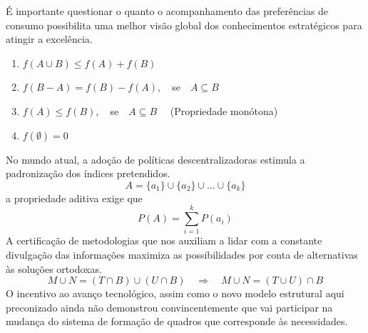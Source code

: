 \documentclass[fleqn]{profmat-cefet}
\begin{document}
É importante questionar o quanto o
acompanhamento das preferências de consumo possibilita uma melhor visão global
dos conhecimentos estratégicos para atingir a excelência. 
\begin{enumerate}[label=\alph*)]
    \item $f(A\cup B)\leq f(A)+f(B)$
    \item $f(B-A)=f(B)-f(A), \quad $se$\quad A\subseteq B$
    \item $f(A)\leq f(B), \quad $se$\quad A\subseteq B \quad$ (Propriedade monótona)
    \item $f(\emptyset)=0$
\end{enumerate}
No mundo atual, a
adoção de políticas descentralizadoras estimula a padronização dos índices
pretendidos. 
\[
    A = \{a_{1}\} \cup \{a_{2}\} \cup \dots \cup \{a_{k} \}
\] 
a propriedade aditiva exige que 
\[
    P(A) = \sum_{i=1}^{k} P({a_{i}})
\]
A certificação de metodologias que nos auxiliam a lidar com a
constante divulgação das informações maximiza as possibilidades por conta de
alternativas às soluções ortodoxas. 
\[
    M \cup N = (T \cap B) \cup (U \cap B)
    \quad
    \Rightarrow 
    \quad 
    M \cup N = (T \cup U) \cap B
\]
O incentivo ao avanço tecnológico, assim
como o novo modelo estrutural aqui preconizado ainda não demonstrou
convincentemente que vai participar na mudança do sistema de formação de quadros
que corresponde às necessidades. 
\newlength{\dectobinlength} 
\setlength{\dectobinlength}{5mm}
\end{document}
